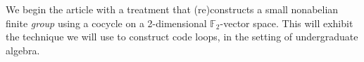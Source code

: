 \documentclass{article}
\theoremstyle{plain}
\theoremstyle{definition}
\def \cC {\mathcal{C}}
\def \cP {\mathcal{P}}
\def \FF {\mathbb{F}}
\begin{document}
We begin the article with a treatment that (re)constructs a small nonabelian finite \emph{group} using a cocycle on a 2-dimensional $\FF_2$-vector space.
This will exhibit the technique we will use to construct code loops, in the setting of undergraduate algebra.













\end{document}
